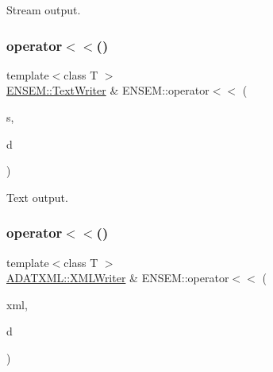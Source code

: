 Stream output. 

\mbox{\label{group__rcomplex_gaddd3f3bfef7fda1dcb327c57c20891bb}} 
\subsubsection{\texorpdfstring{operator$<$$<$()}{operator<<()}\hspace{0.1cm}{\footnotesize\ttfamily [2/3]}}
{\footnotesize\ttfamily template$<$class T $>$ \\
\mbox{\hyperlink{classENSEM_1_1TextWriter}{E\+N\+S\+E\+M\+::\+Text\+Writer}} \& E\+N\+S\+E\+M\+::operator$<$$<$ (\begin{DoxyParamCaption}\item[{\mbox{\hyperlink{classENSEM_1_1TextWriter}{E\+N\+S\+E\+M\+::\+Text\+Writer}} \&}]{s,  }\item[{const \mbox{\hyperlink{classENSEM_1_1RComplex}{R\+Complex}}$<$ T $>$ \&}]{d }\end{DoxyParamCaption})\hspace{0.3cm}{\ttfamily [inline]}}



Text output. 

\mbox{\label{group__rcomplex_gaa63187dcbe17285c7d04fd9887d97b6a}} 
\subsubsection{\texorpdfstring{operator$<$$<$()}{operator<<()}\hspace{0.1cm}{\footnotesize\ttfamily [3/3]}}
{\footnotesize\ttfamily template$<$class T $>$ \\
\mbox{\hyperlink{classADATXML_1_1XMLWriter}{A\+D\+A\+T\+X\+M\+L\+::\+X\+M\+L\+Writer}} \& E\+N\+S\+E\+M\+::operator$<$$<$ (\begin{DoxyParamCaption}\item[{\mbox{\hyperlink{classADATXML_1_1XMLWriter}{A\+D\+A\+T\+X\+M\+L\+::\+X\+M\+L\+Writer}} \&}]{xml,  }\item[{const \mbox{\hyperlink{classENSEM_1_1RComplex}{R\+Complex}}$<$ T $>$ \&}]{d }\end{DoxyParamCaption})\hspace{0.3cm}{\ttfamily [inline]}}



